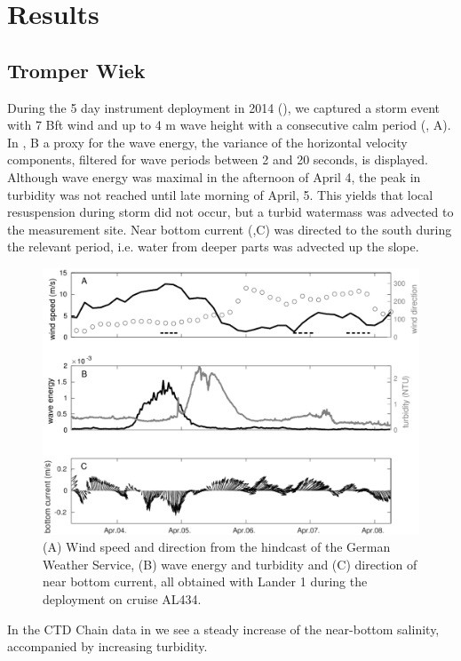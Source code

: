 \section{Results}

\subsection{Tromper Wiek}

During the 5 day instrument deployment in 2014 (), we captured 
a storm event with 7 Bft wind and up to 4 m wave height with a consecutive calm 
period (, A). In , B a proxy for the wave 
energy, the variance of the horizontal velocity components, filtered 
for wave periods between 2 and 20 seconds, is displayed. Although wave energy 
was maximal in the afternoon of April 4, the peak in turbidity was not reached 
until late morning of April, 5. This yields that local resuspension during 
storm did not occur, but a turbid watermass was advected to the measurement 
site. Near bottom current (,C) was directed to the south 
during the relevant period, i.e. water from deeper parts was advected up the 
slope.
 \begin{figure}[ht]
\includegraphics[width=15cm]{bilder/al434tw.pdf}
 \caption{(A) Wind speed and direction from the hindcast of the German Weather 
Service, (B) wave energy and turbidity and (C) direction of 
near bottom current, all obtained with Lander 1 during the deployment on cruise 
AL434.}
 \label{tromperwiek}
 \end{figure}
 
In the CTD Chain data in  we see a steady increase of the 
near-bottom salinity, accompanied by increasing turbidity.

